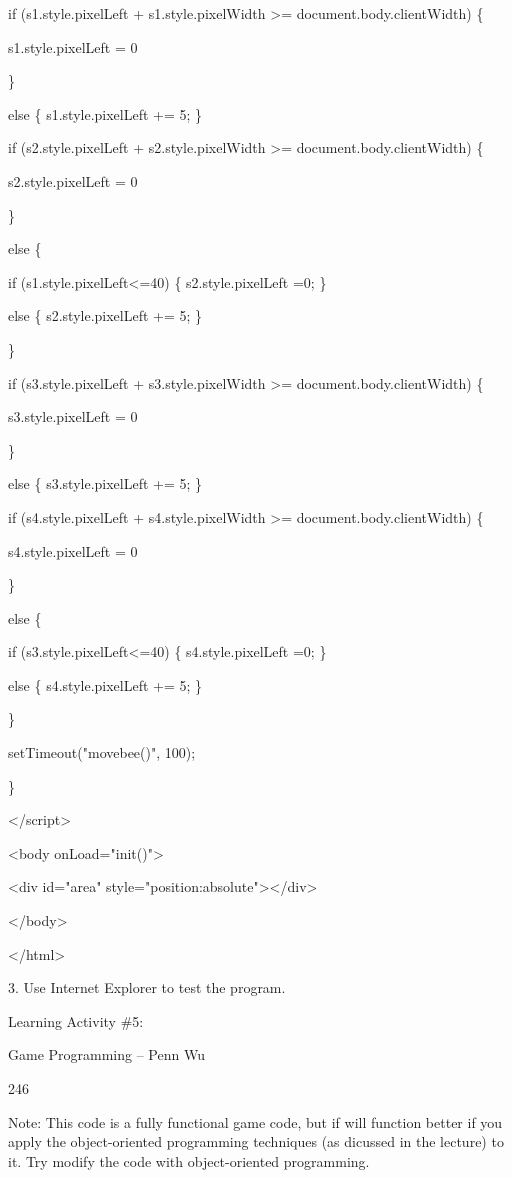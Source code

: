 \documentclass[
]{article}
\begin{document}
if (s1.style.pixelLeft + s1.style.pixelWidth \textgreater=
document.body.clientWidth) \{

s1.style.pixelLeft = 0

\}

else \{ s1.style.pixelLeft += 5; \}

if (s2.style.pixelLeft + s2.style.pixelWidth \textgreater=
document.body.clientWidth) \{

s2.style.pixelLeft = 0

\}

else \{

if (s1.style.pixelLeft\textless=40) \{ s2.style.pixelLeft =0; \}

else \{ s2.style.pixelLeft += 5; \}

\}

if (s3.style.pixelLeft + s3.style.pixelWidth \textgreater=
document.body.clientWidth) \{

s3.style.pixelLeft = 0

\}

else \{ s3.style.pixelLeft += 5; \}

if (s4.style.pixelLeft + s4.style.pixelWidth \textgreater=
document.body.clientWidth) \{

s4.style.pixelLeft = 0

\}

else \{

if (s3.style.pixelLeft\textless=40) \{ s4.style.pixelLeft =0; \}

else \{ s4.style.pixelLeft += 5; \}

\}

setTimeout("movebee()", 100);

\}

\textless/script\textgreater{}

\textless body onLoad="init()"\textgreater{}

\textless div id="area"
style="position:absolute"\textgreater\textless/div\textgreater{}

\textless/body\textgreater{}

\textless/html\textgreater{}

3. Use Internet Explorer to test the program.

Learning Activity \#5:

Game Programming -- Penn Wu

246

\protect\hypertarget{index_split_012.htmlux5cux23p247}{}{}Note: This
code is a fully functional game code, but if will function better if you
apply the object-oriented programming techniques (as dicussed in the
lecture) to it. Try modify the code with object-oriented programming.
\end{document}
